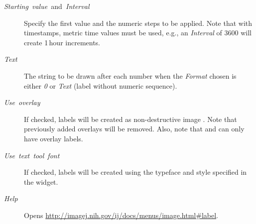 \begin{description}
\item [{\emph{Starting\ value\ }and\emph{\ Interval}}] Specify the first
value and the numeric steps to be applied. Note that with timestamps,
metric time values must be used, e.g., an \emph{Interval} of 3600
will create 1\,hour increments.
\item [{\emph{Text}}] The string to be drawn after each number when the
\emph{Format} chosen is either \emph{0} or \emph{Text} (label without
numeric sequence).
\item [{\emph{Use\ overlay}}] If checked, labels will be created as non-destructive
image . Note that previously added overlays
will be removed. Also, note that  and
 can only have overlay labels.
\item [{\emph{Use\ text\ tool\ font}}] If checked, labels will be created
using the typeface and style specified in the 
widget.
\item [{\emph{Help}}] Opens \href{http://imagej.nih.gov/ij/docs/menus/image.html\#label}{http://imagej.nih.gov/ij/docs/menus/image.html\#{}label}.
\end{description}



\subsubsection{\protect{}\label{sub:Stack>Tools}}


\paragraph{\protect{}\label{sub:Combine...}}

